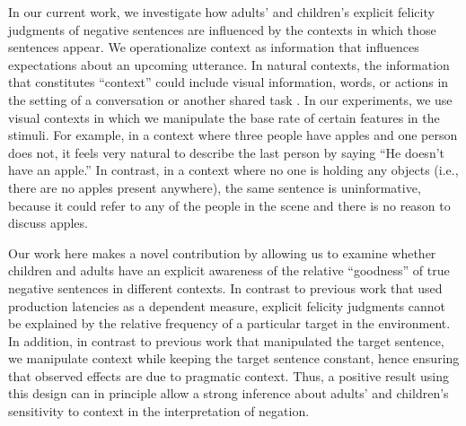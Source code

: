 \documentclass[man, noapacite]{apa2}
\begin{document}
%

In our current work, we investigate how adults' and children's explicit felicity judgments of negative sentences are influenced by the contexts in which those sentences appear. We operationalize context as information that influences expectations about an upcoming utterance. In natural contexts, the information that constitutes ``context'' could include visual information, words, or actions in the setting of a conversation or another shared task \cite{clark1996}. In our experiments, we use visual contexts in which we manipulate the base rate of certain features in the stimuli. For example, in a context where three people have apples and one person does not, it feels very natural to describe the last person by saying ``He doesn't have an apple.'' In contrast, in a context where no one is holding any objects (i.e., there are no apples present anywhere), the same sentence is uninformative, because it could refer to any of the people in the scene and there is no reason to discuss apples.

Our work here makes a novel contribution by allowing us to examine whether children and adults have an explicit awareness of the relative ``goodness'' of true negative sentences in different contexts. In contrast to previous work that used production latencies as a dependent measure, explicit felicity judgments cannot be explained by the relative frequency of a particular target in the environment. In addition, in contrast to previous work that manipulated the target sentence, we manipulate context while keeping the target sentence constant, hence ensuring that observed effects are due to pragmatic context. Thus, a positive result using this design can in principle allow a strong inference about adults' and children's sensitivity to context in the interpretation of negation.

\end{document}
